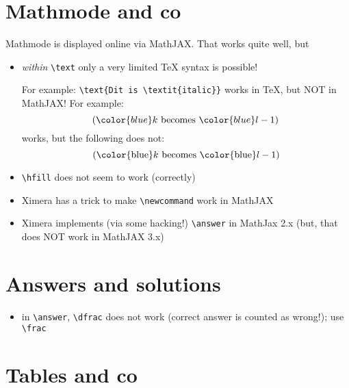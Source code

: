 \documentclass{ximera}
\begin{document}
\author{Wim Obbels}

\label{xim:failcase}

\section {Mathmode and co}

Mathmode is displayed online via MathJAX. That works quite well, but
\begin{itemize}
\item \textit{within} \verb|\text| only a very limited TeX syntax is possible!

For example: \verb|\text{Dit is \textit{italic}}| works in TeX, but NOT in MathJAX!
For example:
$$
({\color{blue}k} \text{ becomes } {\color{blue}l-1})
$$
works, but the following does not:
$$
\text{({\color{blue}$k$} becomes  {\color{blue}$l-1$})}
$$


\item  \verb|\hfill| does not seem to work (correctly)
\item Ximera has a trick to make \verb|\newcommand| work in MathJAX
\item Ximera implements (via some hacking!) \verb|\answer| in MathJax 2.x (but, that does NOT work in MathJAX 3.x)
\end{itemize}

\section{Answers and solutions}

\begin{itemize}
\item in \verb|\answer|, \verb|\dfrac| does not work (correct answer is counted as wrong!); use \verb|\frac|
\end{itemize}

\section {Tables and co}
\end{document}
